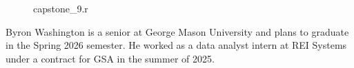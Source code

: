 \documentclass[11pt]{report}
\begin{document}
\begin{figure}[p]
    \begin{boxedminipage}[tb]{\columnwidth}
        \internallinenumbers
        \resetlinenumber[1]
        
    \end{boxedminipage}
    \caption{capstone\_9.r}
    \label{fig:capstone_9.r}
\end{figure}





\biography
Byron Washington is a senior at George Mason University and plans to graduate in the Spring 2026 semester. He worked as a data analyst intern at REI Systems under a contract for GSA in the summer of 2025.
\end{document}
